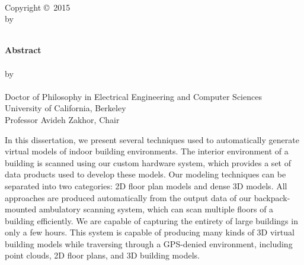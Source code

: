 \documentclass[12pt,onecolumn,oneside]{book}
\begin{document}
\newpage
{\centering
	{\textbf{\mytitle}}\\
	\hfill \break
	\hfill \break
	\hfill \break
	\hfill \break
	\hfill \break
	Copyright \copyright \, 2015\\
	by\\
	\myauthor\\
}


\newpage
{}
\setcounter{page}{1}

{\centering
	{\textbf{Abstract}}\\
	\hfill \break
	\mytitle\\
	\hfill \break
	by\\
	\hfill \break
	\myauthor\\
	\hfill \break
	Doctor of Philosophy in Electrical Engineering and Computer Sciences\\
	\hfill \break
	University of California, Berkeley\\
	\hfill \break
	Professor Avideh Zakhor, Chair\\
	\hfill \break
}

In this dissertation, we present several techniques used to automatically generate virtual models of indoor building environments.  The interior environment of a building is scanned using our custom hardware system, which provides a set of data products used to develop these models.  Our modeling techniques can be separated into two categories:  2D floor plan models and dense 3D models.  All approaches are produced automatically from the output data of our backpack-mounted ambulatory scanning system, which can scan multiple floors of a building efficiently.  We are capable of capturing the entirety of large buildings in only a few hours.  This system is capable of producing many kinds of 3D virtual building models while traversing through a GPS-denied environment, including point clouds, 2D floor plans, and 3D building models.
\end{document}
